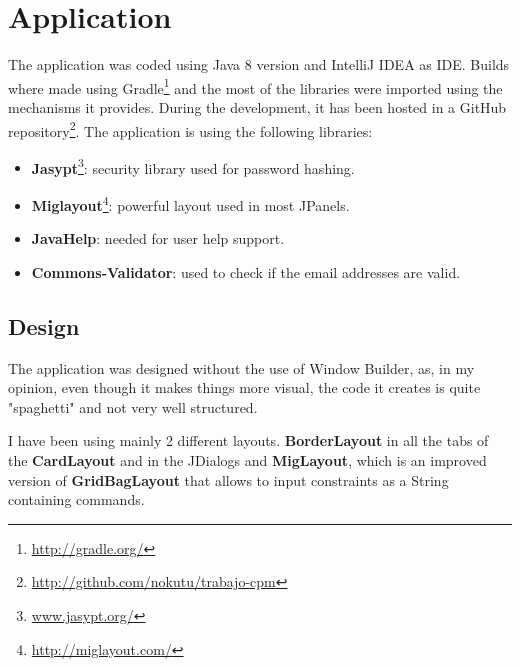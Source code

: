 \documentclass[11pt]{article}
\begin{document}
	\section{Application}
	The application was coded using Java 8 version and IntelliJ IDEA as IDE. Builds where made using Gradle\footnote{\url{http://gradle.org/}} and the most of the libraries were imported using the mechanisms it provides. During the development, it has been hosted in a GitHub repository\footnote{\url{http://github.com/nokutu/trabajo-cpm}}. The application is using the following libraries:
	\begin{itemize}
	   	\item \textbf{Jasypt}\footnote{\url{www.jasypt.org/}}: security library used for password hashing.
	   	\item \textbf{Miglayout}\footnote{\url{http://miglayout.com/}}: powerful layout used in most JPanels.
	   	\item \textbf{JavaHelp}: needed for user help support.
	   	\item \textbf{Commons-Validator}: used to check if the email addresses are valid.
	\end{itemize}
	\subsection{Design}
	The application was designed without the use of Window Builder, as, in my opinion, even though it makes things more visual, the code it creates is quite "spaghetti" and not very well structured.
   
	I have been using mainly 2 different layouts. \textbf{BorderLayout} in all the tabs of the \textbf{CardLayout} and in the JDialogs and \textbf{MigLayout}, which is an improved  version of \textbf{GridBagLayout} that allows to input constraints as a String containing commands.
   
\end{document}
